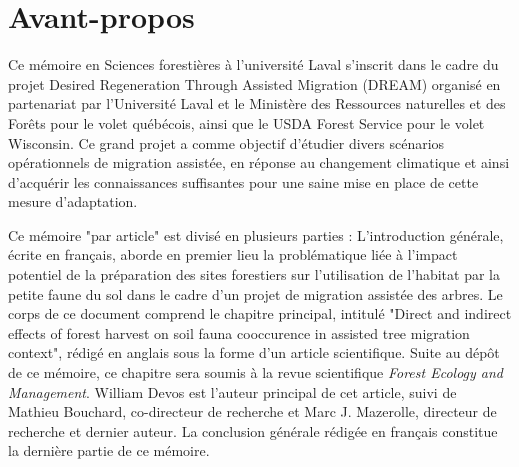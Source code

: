 \chapter*{Avant-propos}         %
\label{chap-avantpropos}        %

Ce mémoire en Sciences forestières à l'université Laval s'inscrit dans le cadre du projet Desired Regeneration Through Assisted Migration (DREAM) organisé en partenariat par l'Université Laval et 
le Ministère des Ressources naturelles et des Forêts pour le volet québécois, ainsi que le USDA Forest Service pour le volet Wisconsin.
Ce grand projet a comme objectif d'étudier divers scénarios opérationnels de migration assistée, en réponse au changement climatique et ainsi d'acquérir les connaissances
suffisantes pour une saine mise en place de cette mesure d'adaptation. 

Ce mémoire "par article" est divisé en plusieurs parties : 
L'introduction générale, écrite en français, aborde en premier lieu la problématique liée à l'impact potentiel de la préparation des sites forestiers sur 
l'utilisation de l'habitat par la petite faune du sol dans le cadre d'un projet de migration assistée des arbres.
Le corps de ce document comprend le chapitre principal, intitulé 
"Direct and indirect effects of forest harvest on soil fauna cooccurence in assisted tree migration context", rédigé en anglais sous la forme d'un article scientifique. 
Suite au dépôt de ce mémoire, ce chapitre sera soumis à la revue scientifique \textit{Forest Ecology and Management}. 
William Devos est l'auteur principal de cet article, suivi de Mathieu Bouchard, co-directeur de recherche et Marc J. Mazerolle, directeur de recherche et dernier auteur.
La conclusion générale rédigée en français constitue la dernière partie de ce mémoire.
